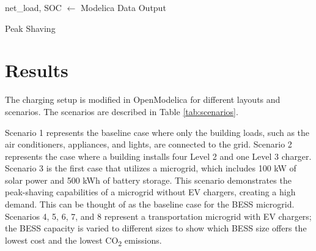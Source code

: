 \documentclass[conference]{IEEEtran}
\begin{document}
		\begin{algorithm}
			net\_load, SOC $\gets$ Modelica Data Output
			\caption{Peak Shaving}
			\label{alg:peakshavingflatrate}
		\end{algorithm}
\section{Results}
		The charging setup is modified in OpenModelica for different layouts and scenarios. The scenarios are described in Table \ref{tab:scenarios}.
		
		Scenario 1 represents the baseline case where only the building loads, such as the air conditioners, appliances, and lights, are connected to the grid. Scenario 2 represents the case where a building installs four Level 2 and one Level 3 charger. Scenario 3 is the first case that utilizes a microgrid, which includes 100 kW of solar power and 500 kWh of battery storage. This scenario demonstrates the peak-shaving capabilities of a microgrid without EV chargers, creating a high demand. This can be thought of as the baseline case for the BESS microgrid. Scenarios 4, 5, 6, 7, and 8 represent a transportation microgrid with EV chargers; the BESS capacity is varied to different sizes to show which BESS size offers the lowest cost and the lowest CO\textsubscript{2} emissions. 
		
\end{document}
